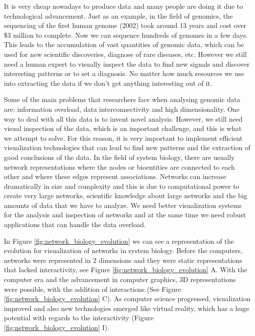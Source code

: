 It is very cheap nowadays to produce data and many people are doing it due to technological advancement. Just as an example, in the field of genomics, the sequencing of the first human genome (2002) took around 13 years and cost over \$3 million to complete. Now we can sequence hundreds of genomes in a few days\cite{big_biological_impacts_bd}. This leads to the accumulation of vast quantities of genomic data, which can be used for new scientific discoveries, diagnose of rare diseases, etc. However we still need a human expert to visually inspect the data to find new signals and discover interesting patterns or to set a diagnosis. No matter how much resources we use into extracting the data if we don't get anything interesting out of it\cite{zhang_paciorkowski_craig_cui_2019}.

Some of the main problems that researchers face when analysing genomic data are: information overload, data interconnectivity and high dimensionality. One way to deal with all this data is to invent novel analysis. However, we still need visual inspection of the data, which is an important challenge, and this is what we attempt to solve. For this reason, it is very important to implement efficient visualization technologies that can lead to find new patterns and the extraction of good conclusions of the data. In the field of system biology, there are usually network representations where the nodes or bioentities are connected to each other and where these edges represent associations. Networks can increase dramatically in size and complexity and this is due to computational power to create very large networks, scientific knowledge about large networks and the big amounts of data that we have to analyze. We need better visualization systems for the analysis and inspection of networks and at the same time we need robust applications that can handle the data overload.

In Figure \ref{fig:network_biology_evolution} we can see a representation of the evolution for visualization of networks in system biology. Before the computers, networks were represented in 2 dimensions and they were static representations that lacked interactivity, see Figure \ref{fig:network_biology_evolution} A. With the computer era and the advancement in computer graphics, 3D representations were possible, with the addition of interactions (See Figure  \ref{fig:network_biology_evolution} C). As computer science progressed, visualization improved and also new technologies emerged like virtual reality, which has a huge potential with regards to the interactivity (Figure \ref{fig:network_biology_evolution} I).

